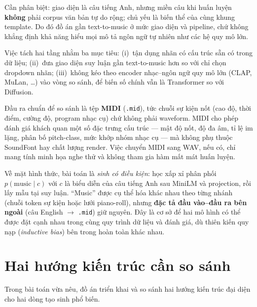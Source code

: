 Cần phân biệt: giao diện là câu tiếng Anh, nhưng miền câu khi huấn luyện \textbf{không} phải corpus văn bản tự do rộng; chủ yếu là biến thể của cùng khung template. Do đó đồ án gần text-to-music ở mức giao diện và pipeline, chứ không khẳng định khả năng hiểu mọi mô tả ngôn ngữ tự nhiên như các hệ quy mô lớn.

Việc tách hai tầng nhằm ba mục tiêu: (i)~tận dụng nhãn có cấu trúc sẵn có trong dữ liệu; (ii)~đưa giao diện suy luận gần text-to-music hơn so với chỉ chọn dropdown nhãn; (iii)~không kéo theo encoder nhạc--ngôn ngữ quy mô lớn (CLAP, MuLan, \ldots) vào vòng so sánh, để biến số chính vẫn là Transformer so với Diffusion.

Đầu ra chuẩn để so sánh là tệp \textbf{MIDI} (\texttt{.mid}), tức chuỗi sự kiện nốt (cao độ, thời điểm, cường độ, program nhạc cụ) chứ không phải waveform. MIDI cho phép đánh giá khách quan một số đặc trưng cấu trúc --- mật độ nốt, độ đa âm, tỉ lệ im lặng, phân bố pitch-class, mức khớp nhóm nhạc cụ --- mà không phụ thuộc SoundFont hay chất lượng render. Việc chuyển MIDI sang WAV, nếu có, chỉ mang tính minh họa nghe thử và không tham gia hàm mất mát huấn luyện.

Về mặt hình thức, bài toán là \textit{sinh có điều kiện}: học xấp xỉ phân phối $p(\text{music}\mid c)$ với $c$ là biểu diễn của câu tiếng Anh sau MiniLM và projection, rồi lấy mẫu tại suy luận. ``Music'' được cụ thể hóa khác nhau theo từng nhánh (chuỗi token sự kiện hoặc lưới piano-roll), nhưng \textbf{đặc tả đầu vào--đầu ra bên ngoài} (câu English $\rightarrow$ \texttt{.mid}) giữ nguyên. Đây là cơ sở để hai mô hình có thể được đặt cạnh nhau trong cùng quy trình dữ liệu và đánh giá, dù thiên kiến quy nạp (\textit{inductive bias}) bên trong hoàn toàn khác nhau.


\section{Hai hướng kiến trúc cần so sánh}
\label{sec:ch1-two-arch}

Trong bài toán vừa nêu, đồ án triển khai và so sánh hai hướng kiến trúc đại diện cho hai dòng tạo sinh phổ biến.

